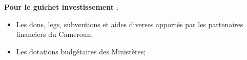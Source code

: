 \begin{enumerate}
\textbf{Pour le guichet investissement };
\begin{itemize}
    \item Les dons, legs, subventions et aides diverses apportés par les partenaires
financiers du Cameroun;
\item Les dotations budgétaires des Ministères;
\end{itemize}
\end{enumerate}

